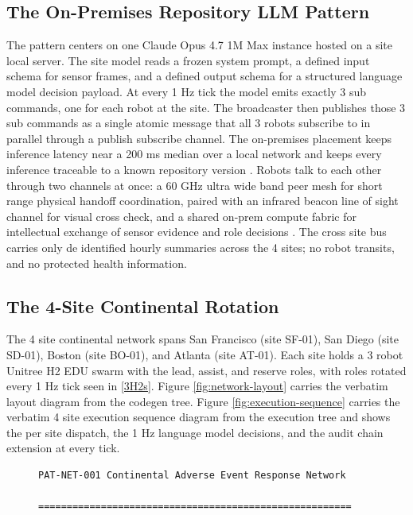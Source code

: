 \begin{sectionaccent}
\subsection{The On-Premises Repository LLM Pattern}
\label{sec:intro-onprem}

The pattern centers on one Claude Opus 4.7 1M Max instance hosted on
a site local server. The site model reads a frozen system prompt, a
defined input schema for sensor frames, and a defined output schema
for a structured language model decision payload. At every 1 Hz tick
the model emits exactly 3 sub commands, one for each robot at the
site. The broadcaster then publishes those 3 sub commands as a single
atomic message that all 3 robots subscribe to in parallel through a
publish subscribe channel. The on-premises placement keeps inference
latency near a 200 ms median over a local network and keeps every
inference traceable to a known repository version
\cite{anthropic_claude_code_2026, anthropic_claude_opus_47_2026}.
Robots talk to each other through two channels at once: a 60 GHz
ultra wide band peer mesh for short range physical handoff
coordination, paired with an infrared beacon line of sight channel
for visual cross check, and a shared on-prem compute fabric for
intellectual exchange of sensor evidence and role decisions
\cite{kawchak_2026_humanoid_instructions}. The cross site bus carries
only de identified hourly summaries across the 4 sites; no robot
transits, and no protected health information.

\subsection{The 4-Site Continental Rotation}
\label{sec:intro-rotation}

The 4 site continental network spans San Francisco (site SF-01), San
Diego (site SD-01), Boston (site BO-01), and Atlanta (site AT-01).
Each site holds a 3 robot Unitree H2 EDU swarm with the lead, assist,
and reserve roles, with roles rotated every 1 Hz tick seen in \autoref{3H2s}. Figure
\ref{fig:network-layout} carries the verbatim layout diagram from
the codegen tree. Figure \ref{fig:execution-sequence} carries the
verbatim 4 site execution sequence diagram from the execution tree
and shows the per site dispatch, the 1 Hz language model decisions,
and the audit chain extension at every tick.

\clearpage

\begin{figure}[H]
\vspace{-0.15cm}
\centering
\begin{Verbatim}[fontsize=\small]
                  PAT-NET-001 Continental Adverse Event Response Network
                  =======================================================


\end{Verbatim}
\end{figure}
\end{sectionaccent}
